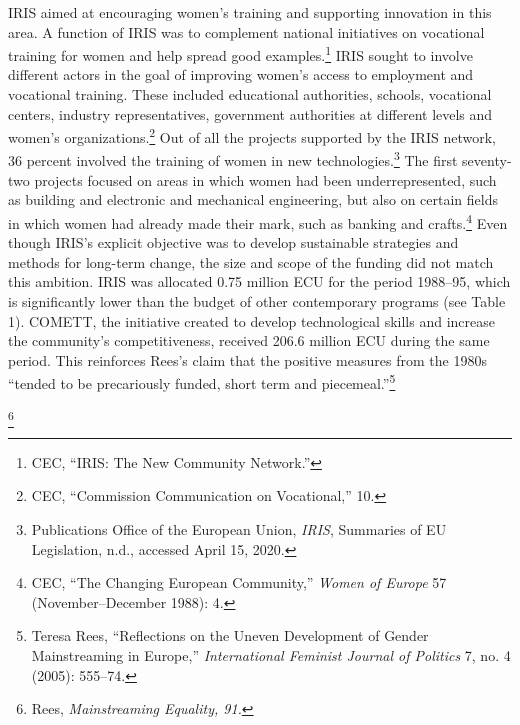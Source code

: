 \documentclass{tufte-handout}
\begin{document}
IRIS aimed at encouraging women's training and supporting innovation in
this area. A function of IRIS was to complement national initiatives on
vocational training for women and help spread good examples.\footnote{CEC,
  ``IRIS: The New Community Network.''} IRIS sought to involve different
actors in the goal of improving women's access to employment and
vocational training. These included educational authorities, schools,
vocational centers, industry representatives, government authorities at
different levels and women's organizations.\footnote{CEC, ``Commission
  Communication on Vocational,'' 10.} Out of all the projects supported
by the IRIS network, 36 percent involved the training of women in new
technologies.\footnote{Publications Office of the European Union,
  \emph{IRIS}, Summaries of EU Legislation, n.d., accessed April 15,
  2020.} The first seventy-two projects focused on areas in which women
had been underrepresented, such as building and electronic and
mechanical engineering, but also on certain fields in which women had
already made their mark, such as banking and crafts.\footnote{CEC, ``The
  Changing European Community,'' \emph{Women of Europe} 57
  (November--December 1988): 4.} Even though IRIS's explicit objective
was to develop sustainable strategies and methods for long-term change,
the size and scope of the funding did not match this ambition. IRIS was
allocated 0.75 million ECU for the period 1988--95, which is
significantly lower than the budget of other contemporary programs (see
Table 1). COMETT, the initiative created to develop technological skills
and increase the community's competitiveness, received 206.6 million ECU
during the same period. This reinforces Rees's claim that the positive
measures from the 1980s ``tended to be precariously funded, short term
and piecemeal.''\footnote{Teresa Rees, ``Reflections on the Uneven
  Development of Gender Mainstreaming in Europe,'' \emph{International
  Feminist Journal of Politics} 7, no. 4 (2005): 555--74.}

\vspace{.2in}

\footnote{Rees, \emph{Mainstreaming Equality, 91.}}


\vspace*{1em}
\end{document}
